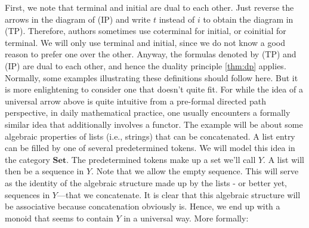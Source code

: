 First, we note that terminal and initial are dual to each other.
Just reverse the arrows in the diagram of (IP) and write $t$ instead of $i$ to obtain the diagram in (TP).
Therefore, authors sometimes use coterminal for initial, or coinitial for terminal.
We will only use terminal and initial, since we do not know a good reason to prefer one over the other.
Anyway, the formulas denoted by (TP) and (IP)
are dual to each other, and hence the duality principle \ref{thm:dp} applies.
\\
Normally, some examples illustrating these definitions should follow here.
But it is more enlightening to consider one that doesn't quite fit.
For while the idea of a universal arrow above is quite intuitive from a pre-formal directed path perspective, in daily mathematical practice, one usually encounters a formally similar idea that additionally involves a functor.
The example will be about some algebraic properties of lists (i.e., strings) that can be concatenated.
A list entry can be filled by one of several predetermined tokens.
We will model this idea in the category $\mathbf{Set}$.
The predetermined tokens make up a set we'll call $Y$.
A list will then be a sequence in $Y$.
Note that we allow the empty sequence.
This will serve as the identity of the algebraic structure made up by the lists - or better yet, sequences in $Y$—that we concatenate.
It is clear that this algebraic structure will be associative because concatenation obviously is.
Hence, we end up with a monoid that seems to contain $Y$ in a {\glqq}universal way{\glqq}.
More formally:
\\
